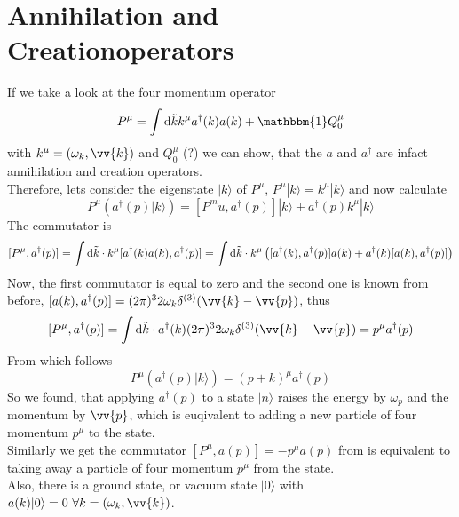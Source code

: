 \documentclass{include/thesisclass}
\newcommand{\cc}{\cdot}
\newcommand{\rk}{\rangle}
\newcommand{\vp}{\vv{p}}
\newcommand{\dd}{{\rm d}}
\newcommand{\ehm}{\mathbbm{1}}
\begin{document}
\section{Annihilation and Creationoperators}
If we take a look at the four momentum operator
\[P^\mu = \int \dd \tilde{k} k^\mu a^\dagger(k) a(k) + \ehm Q_0^\mu\]
with $k^\mu = (\omega_k, \vv{k})$ and $Q_0^\mu$ (?) we can show, that the $a$ and $a^\dagger$ are infact annihilation and creation operators.\\
Therefore, lets consider the eigenstate $|k\rk$ of $P^\mu$, $P^\mu|k\rk = k^\mu|k\rk$ and now calculate
\[ P^\mu\left( a^\dagger(p) |k\rk\right) = [ P^mu, a^\dagger(p)]|k\rk + a^\dagger(p) k^\mu|k\rk\]
The commutator is
\[ [P^\mu, a^\dagger(p)] = \int \dd \tilde{k}\cc k^\mu [ a^\dagger(k)a(k), a^\dagger(p)] = \int \dd \tilde{k}\cc k^\mu \left([ a^\dagger(k), a^\dagger(p)]a(k) + a^\dagger(k) [a(k), a^\dagger(p)]\right)\]
Now, the first commutator is equal to zero and the second one is known from before, $[a(k), a^\dagger(p)] = (2\pi)^3 2 \omega_k \delta^{(3)} (\vv{k} - \vp)$, thus
\[ [P^\mu, a^\dagger(p)] = \int \dd \tilde{k}\cc a^\dagger(k)(2\pi)^3 2 \omega_k \delta^{(3)}(\vv{k}-\vp) = p^\mu a^\dagger(p)\]
From which follows
\[ P^\mu \left( a^\dagger(p) |k\rk\right) = ( p + k )^\mu a^\dagger(p)\]
So we found, that applying $a^\dagger(p)$ to a state $|n\rk$ raises the energy by $\omega_p$ and the momentum by $\vp$, which is euqivalent to adding a new particle of four momentum $p^\mu$ to the state.\\
Similarly we get the commutator $[P^\mu, a(p)] = - p^\mu a(p)$ from is equivalent to taking away a particle of four momentum $p^\mu$ from the state.\\
Also, there is a ground state, or vacuum state $|0\rk$ with $a(k) |0\rk = 0 ~\forall k = (\omega_k, \vv{k})$.
\end{document}

